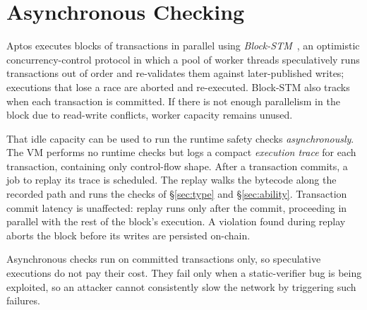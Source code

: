 \section{Asynchronous Checking}
\label{sec:async}

Aptos executes blocks of transactions in parallel using \emph{Block-STM}~\cite{BlockSTM}, an optimistic concurrency-control protocol in which a pool of worker threads speculatively runs transactions out of order and re-validates them against later-published writes; executions that lose a race are aborted and re-executed.
Block-STM also tracks when each transaction is committed.
If there is not enough parallelism in the block due to read-write conflicts, worker capacity remains unused.

That idle capacity can be used to run the runtime safety checks \emph{asynchronously}.
The VM performs no runtime checks but logs a compact \emph{execution trace} for each transaction, containing only control-flow shape.
After a transaction commits, a job to replay its trace is scheduled.
The replay walks the bytecode along the recorded path and runs the checks of \S\ref{sec:type} and \S\ref{sec:ability}.
Transaction commit latency is unaffected: replay runs only after the commit, proceeding in parallel with the rest of the block's execution.
A violation found during replay aborts the block before its writes are persisted on-chain.

Asynchronous checks run on committed transactions only, so speculative executions do not pay their cost.
They fail only when a static-verifier bug is being exploited, so an attacker cannot consistently slow the network by triggering such failures.

